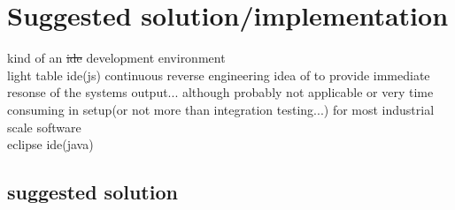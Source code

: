 \chapter{Suggested solution/implementation}

kind of an \sout{ide} development environment\\
light table ide(js) continuous reverse engineering idea of \cite{Muller:2000:RER:336512.336526} to provide immediate resonse of the systems output... although probably not applicable or very time consuming in setup(or not more than integration testing...) for most industrial scale software\\
eclipse ide(java)

\section{suggested solution}

